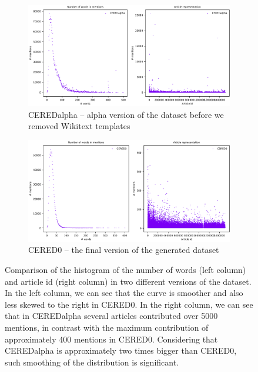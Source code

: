 \begin{figure}
\begin{subfigure}{1\textwidth}
\centering
\includegraphics[width = 1\textwidth]{./img/Histograms_2020-07-19_21-00-53_CEREDalpha.png}
\caption{CEREDalpha -- alpha version of the dataset before we removed Wikitext templates}
\end{subfigure}
\par\medskip
\begin{subfigure}{1\textwidth}
\centering
\includegraphics[width = 1\textwidth]{./img/Histograms_2020-07-19_21-00-53_CERED0.png}
\caption{CERED0 -- the final version of the generated dataset}
\end{subfigure}
\caption{Comparison of the histogram of the number of words (left column) and article id (right column) in two different versions of the dataset. In the left column, we can see that the curve is smoother and also less skewed to the right in CERED0. In the right column, we can see that in CEREDalpha several articles contributed over 5000 mentions, in contrast with the maximum contribution of approximately 400 mentions in CERED0. Considering that CEREDalpha is approximately two times bigger than CERED0, such smoothing of the distribution is significant.}
\label{obr:ukazka_histogramu}
\end{figure}

